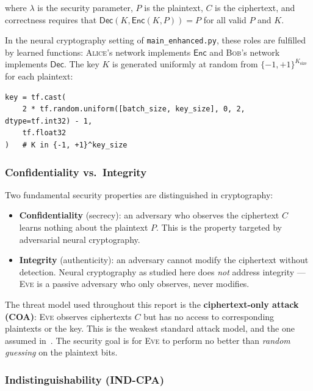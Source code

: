 \documentclass[12pt, a4paper]{article}
\newcommand{\alice}{\textsc{Alice}}
\newcommand{\bob}{\textsc{Bob}}
\newcommand{\eve}{\textsc{Eve}}
\newcommand{\code}[1]{\texttt{\color{CodeRed}#1}}
\begin{document}
\noindent where $\lambda$ is the security parameter, $P$ is the plaintext,
$C$ is the ciphertext, and correctness requires that
$\mathsf{Dec}(K, \mathsf{Enc}(K, P)) = P$ for all valid $P$ and $K$.

In the neural cryptography setting of \code{main\_enhanced.py}, these roles
are fulfilled by learned functions: \alice{}'s network implements
$\mathsf{Enc}$ and \bob{}'s network implements $\mathsf{Dec}$. The key $K$
is generated uniformly at random from $\{-1,+1\}^{K_{\text{size}}}$ for
each plaintext:

\begin{lstlisting}[caption={Key and plaintext generation in \code{main\_enhanced.py}}]
key = tf.cast(
    2 * tf.random.uniform([batch_size, key_size], 0, 2, dtype=tf.int32) - 1,
    tf.float32
)   # K in {-1, +1}^key_size
\end{lstlisting}

\subsubsection*{Confidentiality vs.\ Integrity}

Two fundamental security properties are distinguished in cryptography:

\begin{itemize}[leftmargin=1.8em, itemsep=4pt]
  \item \textbf{Confidentiality} (secrecy): an adversary who observes the
        ciphertext $C$ learns nothing about the plaintext $P$. This is the
        property targeted by adversarial neural cryptography.
  \item \textbf{Integrity} (authenticity): an adversary cannot modify the
        ciphertext without detection. Neural cryptography as studied here
        does \emph{not} address integrity — \eve{} is a passive adversary
        who only observes, never modifies.
\end{itemize}

The threat model used throughout this report is the \textbf{ciphertext-only
attack (COA)}: \eve{} observes ciphertexts $C$ but has no access to
corresponding plaintexts or the key. This is the weakest standard attack
model, and the one assumed in~\cite{abadi2016learning}. The security
goal is for \eve{} to perform no better than \emph{random guessing} on
the plaintext bits.

\subsubsection*{Indistinguishability (IND-CPA)}
\end{document}
